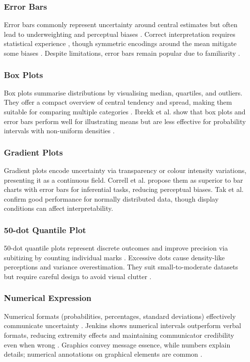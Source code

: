\documentclass[final,journal,a4paper]{IEEEtran}
\begin{document}
\subsubsection{Error Bars}
Error bars commonly represent uncertainty around central estimates but often lead to underweighting and perceptual biases \cite{Hullman2015, Correll2014, Newman2012}. Correct interpretation requires statistical experience \cite{Belia2005}, though symmetric encodings around the mean mitigate some biases \cite{Correll2014}. Despite limitations, error bars remain popular due to familiarity \cite{Skeels2008}.

\subsubsection{Box Plots}
Box plots summarise distributions by visualising median, quartiles, and outliers. They offer a compact overview of central tendency and spread, making them suitable for comparing multiple categories \cite{Chatti2024}. Ibrekk et al. \cite{Ibrekk1987} show that box plots and error bars perform well for illustrating means but are less effective for probability intervals with non-uniform densities \cite{Ibrekk1987}.

\subsubsection{Gradient Plots}
Gradient plots encode uncertainty via transparency or colour intensity variations, presenting it as a continuous field. Correll et al. \cite{Correll2014} propose them as superior to bar charts with error bars for inferential tasks, reducing perceptual biases. Tak et al. \cite{Tak2014} confirm good performance for normally distributed data, though display conditions can affect interpretability.

\subsubsection{50-dot Quantile Plot}
50-dot quantile plots represent discrete outcomes and improve precision via subitizing by counting individual marks \cite{Kay2016}. Excessive dots cause density-like perceptions and variance overestimation. They suit small-to-moderate datasets but require careful design to avoid visual clutter \cite{Kay2016}.

\subsubsection{Numerical Expression}
Numerical formats (probabilities, percentages, standard deviations) effectively communicate uncertainty \cite{GrietheSchumann}. Jenkins shows numerical intervals outperform verbal formats, reducing extremity effects and maintaining communicator credibility even when wrong \cite{Jenkins2020}. Graphics convey message essence, while numbers explain details; numerical annotations on graphical elements are common \cite{Feldman-Stewart2007, Spiegelhalter2017, Kay2016}.
\end{document}
